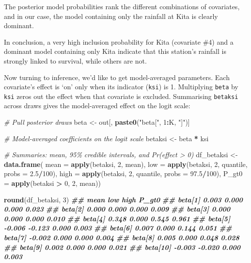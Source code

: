 \documentclass[
  12pt,
]{krantz}
\newenvironment{Shaded}{\begin{snugshade}}{\end{snugshade}}
\newcommand{\AttributeTok}[1]{\textcolor[rgb]{0.13,0.29,0.53}{#1}}
\newcommand{\CommentTok}[1]{\textcolor[rgb]{0.56,0.35,0.01}{\textit{#1}}}
\newcommand{\DecValTok}[1]{\textcolor[rgb]{0.00,0.00,0.81}{#1}}
\newcommand{\DocumentationTok}[1]{\textcolor[rgb]{0.56,0.35,0.01}{\textbf{\textit{#1}}}}
\newcommand{\FloatTok}[1]{\textcolor[rgb]{0.00,0.00,0.81}{#1}}
\newcommand{\FunctionTok}[1]{\textcolor[rgb]{0.13,0.29,0.53}{\textbf{#1}}}
\newcommand{\NormalTok}[1]{#1}
\newcommand{\OtherTok}[1]{\textcolor[rgb]{0.56,0.35,0.01}{#1}}
\newcommand{\SpecialCharTok}[1]{\textcolor[rgb]{0.81,0.36,0.00}{\textbf{#1}}}
\newcommand{\StringTok}[1]{\textcolor[rgb]{0.31,0.60,0.02}{#1}}
\begin{document}
The posterior model probabilities rank the different combinations of covariates, and in our case, the model containing only the rainfall at Kita is clearly dominant.

In conclusion, a very high inclusion probability for Kita (covariate \#4) and a dominant model containing only Kita indicate that this station's rainfall is strongly linked to survival, while others are not.

Now turning to inference, we'd like to get model-averaged parameters. Each covariate's effect is `on' only when its indicator (\texttt{ksi}) is 1. Multiplying \texttt{beta} by \texttt{ksi} zeros out the effect when that covariate is excluded. Summarising \texttt{betaksi} across draws gives the model-averaged effect on the logit scale:

\begin{Shaded}
\begin{Highlighting}[]
\CommentTok{\# Pull posterior draws}
\NormalTok{beta  }\OtherTok{\textless{}{-}}\NormalTok{ out[, }\FunctionTok{paste0}\NormalTok{(}\StringTok{"beta["}\NormalTok{, }\DecValTok{1}\SpecialCharTok{:}\NormalTok{K, }\StringTok{"]"}\NormalTok{)]}

\CommentTok{\# Model{-}averaged coefficients on the logit scale}
\NormalTok{betaksi }\OtherTok{\textless{}{-}}\NormalTok{ beta }\SpecialCharTok{*}\NormalTok{ ksi}

\CommentTok{\# Summaries: mean, 95\% credible intervals, and Pr(effect \textgreater{} 0)}
\NormalTok{df\_betaksi }\OtherTok{\textless{}{-}} \FunctionTok{data.frame}\NormalTok{(}
  \AttributeTok{mean  =} \FunctionTok{apply}\NormalTok{(betaksi, }\DecValTok{2}\NormalTok{, mean),}
  \AttributeTok{low  =} \FunctionTok{apply}\NormalTok{(betaksi, }\DecValTok{2}\NormalTok{, quantile, }\AttributeTok{probs =} \FloatTok{2.5}\SpecialCharTok{/}\DecValTok{100}\NormalTok{),}
  \AttributeTok{high  =} \FunctionTok{apply}\NormalTok{(betaksi, }\DecValTok{2}\NormalTok{, quantile, }\AttributeTok{probs =} \FloatTok{97.5}\SpecialCharTok{/}\DecValTok{100}\NormalTok{),}
  \AttributeTok{P\_gt0 =} \FunctionTok{apply}\NormalTok{(betaksi }\SpecialCharTok{\textgreater{}} \DecValTok{0}\NormalTok{, }\DecValTok{2}\NormalTok{, mean))}

\FunctionTok{round}\NormalTok{(df\_betaksi, }\DecValTok{3}\NormalTok{)}
\DocumentationTok{\#\#            mean    low  high P\_gt0}
\DocumentationTok{\#\# beta[1]   0.003  0.000 0.000 0.023}
\DocumentationTok{\#\# beta[2]   0.000  0.000 0.000 0.009}
\DocumentationTok{\#\# beta[3]   0.000  0.000 0.000 0.010}
\DocumentationTok{\#\# beta[4]   0.348  0.000 0.545 0.961}
\DocumentationTok{\#\# beta[5]  {-}0.006 {-}0.123 0.000 0.003}
\DocumentationTok{\#\# beta[6]   0.007  0.000 0.144 0.051}
\DocumentationTok{\#\# beta[7]  {-}0.002  0.000 0.000 0.004}
\DocumentationTok{\#\# beta[8]   0.005  0.000 0.048 0.028}
\DocumentationTok{\#\# beta[9]   0.002  0.000 0.000 0.021}
\DocumentationTok{\#\# beta[10] {-}0.003 {-}0.020 0.000 0.003}
\end{Highlighting}
\end{Shaded}
\end{document}

